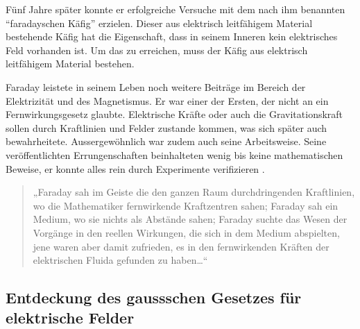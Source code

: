 Fünf Jahre später konnte er erfolgreiche Versuche mit dem nach ihm benannten ``faradayschen Käfig'' erzielen.
Dieser aus elektrisch leitfähigem Material bestehende Käfig hat die Eigenschaft, dass in seinem Inneren kein elektrisches Feld vorhanden ist.
Um das zu erreichen, muss der Käfig aus elektrisch leitfähigem Material bestehen.

Faraday leistete in seinem Leben noch weitere Beiträge im Bereich der Elektrizität und des Magnetismus. 
Er war einer der Ersten, der nicht an ein Fernwirkungsgesetz glaubte.
Elektrische Kräfte oder auch die Gravitationskraft sollen durch Kraftlinien und Felder zustande kommen, was sich später auch bewahrheitete.
Aussergewöhnlich war zudem auch seine Arbeitsweise.
Seine veröffentlichten Errungenschaften beinhalteten wenig bis keine mathematischen Beweise, er konnte alles rein durch Experimente verifizieren \cite{maxwell:Michael_Faraday}.
\begin{quote}
	„Faraday sah im Geiste die den ganzen Raum durchdringenden Kraftlinien, wo die Mathematiker fernwirkende Kraftzentren sahen; Faraday sah ein Medium, wo sie nichts als Abstände sahen; Faraday suchte das Wesen der Vorgänge in den reellen Wirkungen, die sich in dem Medium abspielten, jene waren aber damit zufrieden, es in den fernwirkenden Kräften der elektrischen Fluida gefunden zu haben…“ \cite{maxwell:zitat}
\end{quote}

\subsection{Entdeckung des gaussschen Gesetzes für elektrische Felder}

